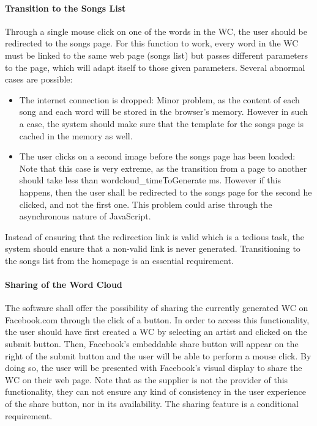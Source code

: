 \documentclass[]{article}
\begin{document}
\paragraph{Transition to the Songs
List}\label{transition-to-the-songs-list}

Through a single mouse click on one of the words in the WC, the user
should be redirected to the songs page. For this function to work, every
word in the WC must be linked to the same web page (songs list) but
passes different parameters to the page, which will adapt itself to
those given parameters. Several abnormal cases are possible:

\begin{itemize}
\itemsep1pt\parskip0pt
\item
  The internet connection is dropped: Minor problem, as the content of
  each song and each word will be stored in the browser's memory.
  However in such a case, the system should make sure that the template
  for the songs page is cached in the memory as well.
\item
  The user clicks on a second image before the songs page has been
  loaded: Note that this case is very extreme, as the transition from a
  page to another should take less than wordcloud\_timeToGenerate ms.
  However if this happens, then the user shall be redirected to the
  songs page for the second he clicked, and not the first one. This
  problem could arise through the asynchronous nature of JavaScript.
\end{itemize}

Instead of ensuring that the redirection link is valid which is a
tedious task, the system should ensure that a non-valid link is never
generated. Transitioning to the songs list from the homepage is an
essential requirement.

\paragraph{Sharing of the Word Cloud}\label{sharing-of-the-word-cloud}

The software shall offer the possibility of sharing the currently
generated WC on Facebook.com through the click of a button. In order to
access this functionality, the user should have first created a WC by
selecting an artist and clicked on the submit button. Then, Facebook's
embeddable share button will appear on the right of the submit button
and the user will be able to perform a mouse click. By doing so, the
user will be presented with Facebook's visual display to share the WC on
their web page. Note that as the supplier is not the provider of this
functionality, they can not ensure any kind of consistency in the user
experience of the share button, nor in its availability. The sharing
feature is a conditional requirement.
\end{document}
